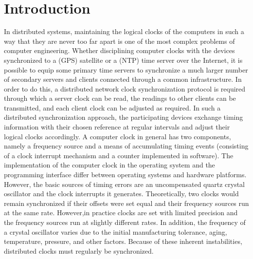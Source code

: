 \section{Introduction}
  
    In distributed systems, maintaining the logical clocks of the computers in such a way that they are never too far apart is one of the most complex problems of computer engineering. Whether disciplining computer clocks with the devices synchronized to a (GPS) satellite or a (NTP)\cite{sync4} time server over the Internet, it is possible to equip some primary time servers to synchronize a much larger number of secondary servers and clients connected through a common infrastructure. In order to do this, a distributed network clock synchronization protocol is required through which a server clock can be read, the readings to other clients can be transmitted, and each client clock can be adjusted as required. In such a distributed synchronization approach, the participating devices exchange timing information with their chosen reference at regular intervals and adjust their logical clocks accordingly.\newline
    A computer clock in general has two components, namely a frequency source and a means of accumulating timing events (consisting of a clock interrupt mechanism and a counter implemented in software). The implementation of the computer clock in the operating system and the programming interface differ
    between operating systems and hardware platforms. However, the basic sources of timing errors are an uncompensated quartz crystal oscillator and the clock interrupts it generates. Theoretically, two clocks would remain synchronized if their offsets were set equal and their frequency sources run at the same rate. However,in practice clocks are set with limited precision and the frequency sources run at slightly different rates. In addition, the frequency of a crystal oscillator varies due to the initial manufacturing tolerance, aging, temperature, pressure, and other factors. Because of these inherent instabilities, distributed clocks must regularly be synchronized.

